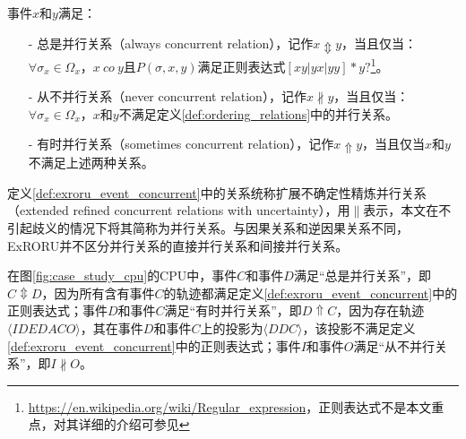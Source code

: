\begin{definition}[事件间扩展不确定性精炼并行关系]\label{def:exroru_event_concurrent}
事件$x$和$y$满足：
  \begin{itemize}
  	\item[-] 总是并行关系（always concurrent relation），记作$x\Updownarrow y$，当且仅当：$\forall\sigma_{x}\in\Omega_{x}$，$x~co~y$且$P(\sigma,x,y)$满足正则表达式$[xy|yx|yy]*y?$\footnote{\url{https://en.wikipedia.org/wiki/Regular\_expression}，正则表达式不是本文重点，对其详细的介绍可参见}。
  	\item[-] 从不并行关系（never concurrent relation），记作$x\nparallel y$，当且仅当：$\forall\sigma_{x}\in\Omega_{x}$，$x$和$y$不满足定义\ref{def:ordering_relations}中的并行关系。
  	\item[-] 有时并行关系（sometimes concurrent relation），记作$x\Uparrow y$，当且仅当$x$和$y$不满足上述两种关系。
  \end{itemize}
\end{definition}

定义\ref{def:exroru_event_concurrent}中的关系统称扩展不确定性精炼并行关系（extended refined concurrent relations with uncertainty），用$\parallel$表示，本文在不引起歧义的情况下将其简称为并行关系。与因果关系和逆因果关系不同，ExRORU并不区分并行关系的直接并行关系和间接并行关系。

\begin{example}\label{ex:exroru_event_concurrent}
在图\ref{fig:case_study_cpu}的CPU中，事件$C$和事件$D$满足“总是并行关系”，即$C\Updownarrow D$，因为所有含有事件$C$的轨迹都满足定义\ref{def:exroru_event_concurrent}中的正则表达式；事件$D$和事件$C$满足“有时并行关系”，即$D\Uparrow C$，因为存在轨迹$\langle IDEDACO\rangle$，其在事件$D$和事件$C$上的投影为$\langle DDC\rangle$，该投影不满足定义\ref{def:exroru_event_concurrent}中的正则表达式；事件$I$和事件$O$满足“从不并行关系”，即$I\nparallel O$。
\end{example}

